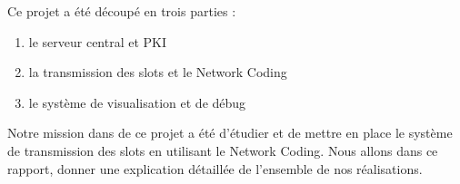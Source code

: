 Ce projet a été découpé en trois parties : 
\begin{enumerate} 
    \item le serveur central et PKI
    \item la transmission des slots et le Network Coding
    \item le système de visualisation et de débug
\end{enumerate}

Notre mission dans de ce projet a  été d'étudier et de mettre en place le système de transmission des slots en utilisant le Network Coding. Nous allons dans ce rapport, donner une explication détaillée de l'ensemble de nos réalisations.     



